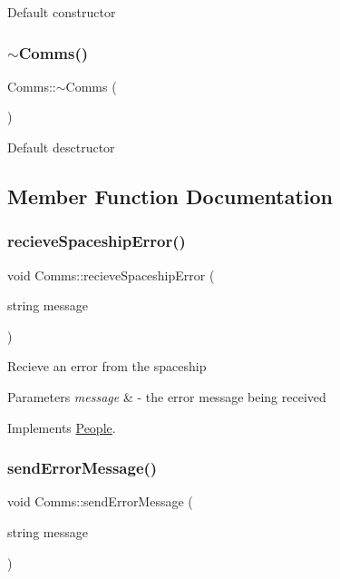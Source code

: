 Default constructor \mbox{\label{classComms_ad18d3a80a82d18d27b0de3b551e4f5fc}} 
\subsubsection{\texorpdfstring{$\sim$\+Comms()}{~Comms()}}
{\footnotesize\ttfamily Comms\+::$\sim$\+Comms (\begin{DoxyParamCaption}{ }\end{DoxyParamCaption})\hspace{0.3cm}{\ttfamily [inline]}}

Default desctructor 

\subsection{Member Function Documentation}
\mbox{\label{classComms_a1aed1c01a813afd55309fdc59d2871bf}} 
\subsubsection{\texorpdfstring{recieve\+Spaceship\+Error()}{recieveSpaceshipError()}}
{\footnotesize\ttfamily void Comms\+::recieve\+Spaceship\+Error (\begin{DoxyParamCaption}\item[{string}]{message }\end{DoxyParamCaption})\hspace{0.3cm}{\ttfamily [virtual]}}

Recieve an error from the spaceship 
\begin{DoxyParams}{Parameters}
{\em message} & -\/ the error message being received \\
\hline
\end{DoxyParams}


Implements \hyperlink{classPeople_a0685df78be631783138865e03cc7c85d}{People}.

\mbox{\label{classComms_a23c37f6d10f06c7cfe25c4dc7d62fa12}} 
\subsubsection{\texorpdfstring{send\+Error\+Message()}{sendErrorMessage()}}
{\footnotesize\ttfamily void Comms\+::send\+Error\+Message (\begin{DoxyParamCaption}\item[{string}]{message }\end{DoxyParamCaption})\hspace{0.3cm}{\ttfamily [virtual]}}


